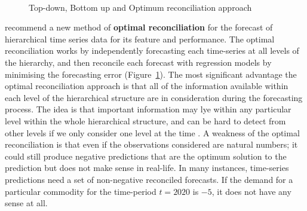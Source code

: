 \begin{figure}[!h]
	\centering
	\\
	\caption{Top-down, Bottom up and Optimum reconciliation approach}
	\label{fig:approaches}
\end{figure}

\newpara 

\cite{hyndman2011optimal} recommend a new method of \textbf{optimal reconciliation} for the forecast of hierarchical time series data for its feature and performance. The optimal reconciliation works by independently forecasting each time-series at all levels of the hierarchy, and then reconcile each forecast with regression models by minimising the forecasting error (Figure~\ref{fig:approaches}). The most significant advantage the optimal reconciliation approach is that all of the information available within each level of the hierarchical structure are in consideration during the forecasting process. The idea is that important information may lye within any particular level within the whole hierarchical structure, and can be hard to detect from other levels if we only consider one level at the time \citep{hyndman2018forecasting}. A weakness of the optimal reconciliation is that even if the observations considered are natural numbers; it could still produce negative predictions that are the optimum solution to the prediction but does not make sense in real-life. In many instances, time-series predictions need a set of non-negative reconciled forecasts. If the demand for a particular commodity for the time-period $t = 2020$ is $-5$, it does not have any sense at all. 

